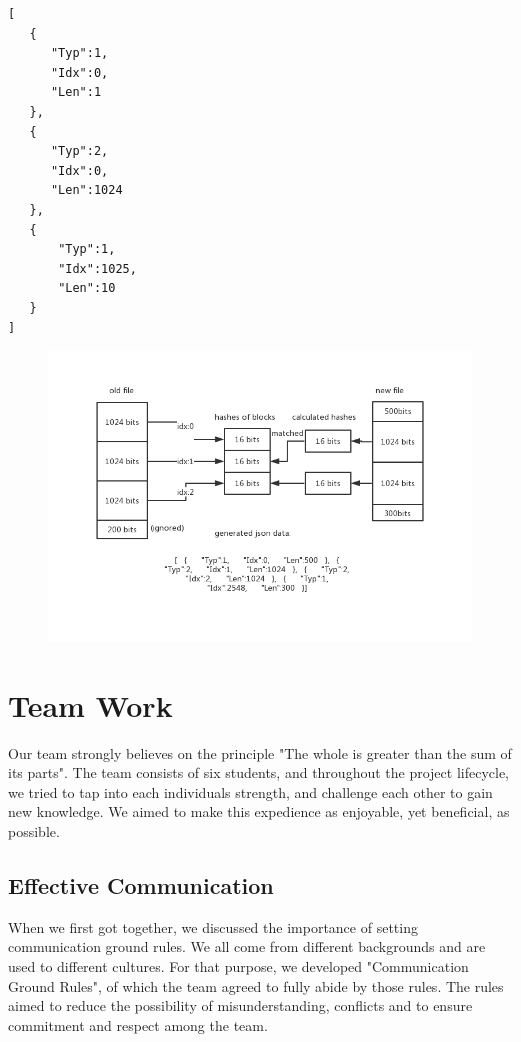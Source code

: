\documentclass{article}
\begin{document}
\begin{lstlisting}
[
   {
      "Typ":1,
      "Idx":0,
      "Len":1
   },
   {
      "Typ":2,
      "Idx":0,
      "Len":1024
   },
   {
       "Typ":1,
       "Idx":1025,
       "Len":10
   }
]

\end{lstlisting}

 \begin{figure}[H]
     \centering
     \includegraphics[width=1.1\textwidth]{reassembling-stage}
     \caption{}
     \label{fig:reassembling-stage}
 \end{figure}


\section{Team Work}
Our team strongly believes on the principle "The whole is greater than the sum of its parts". The team consists of six students, and throughout the project lifecycle, we tried to tap into each individuals strength, and challenge each other to gain new knowledge. We aimed to make this expedience as enjoyable, yet beneficial, as possible.

\subsection{Effective Communication}
When we first got together, we discussed the importance of setting communication ground rules. We all come from different backgrounds and are used to different cultures. For that purpose, we developed "Communication Ground Rules", of which the team agreed to fully abide by those rules. The rules aimed to reduce the possibility of misunderstanding, conflicts and to ensure commitment and respect among the team.
\end{document}
